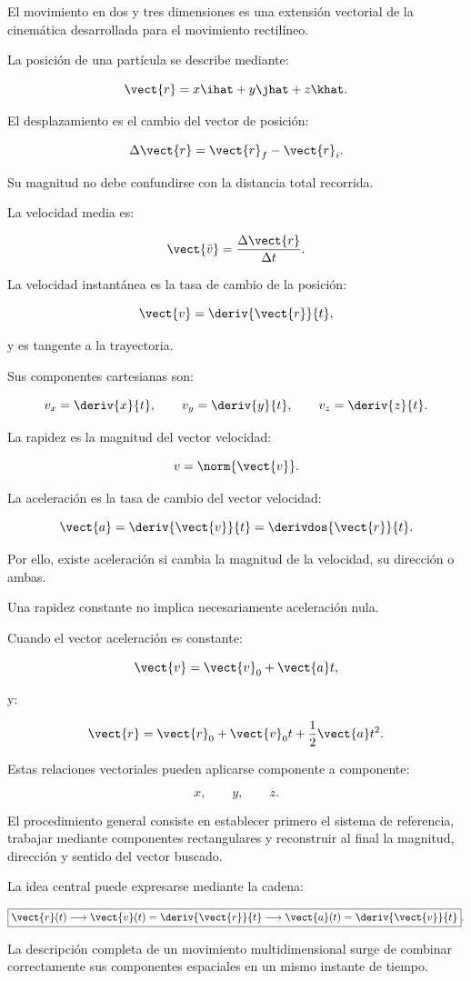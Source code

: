 \begin{resumen}
El movimiento en dos y tres dimensiones es una extensión vectorial de la
cinemática desarrollada para el movimiento rectilíneo.

La posición de una partícula se describe mediante:

\[
\vect{r}
=
x\ihat+y\jhat+z\khat.
\]

El desplazamiento es el cambio del vector de posición:

\[
\Delta\vect{r}
=
\vect{r}_f-\vect{r}_i.
\]

Su magnitud no debe confundirse con la distancia total recorrida.

La velocidad media es:

\[
\vect{\bar{v}}
=
\frac{\Delta\vect{r}}{\Delta t}.
\]

La velocidad instantánea es la tasa de cambio de la posición:

\[
\vect{v}
=
\deriv{\vect{r}}{t},
\]

y es tangente a la trayectoria.

Sus componentes cartesianas son:

\[
v_x=\deriv{x}{t},
\qquad
v_y=\deriv{y}{t},
\qquad
v_z=\deriv{z}{t}.
\]

La rapidez es la magnitud del vector velocidad:

\[
v=\norm{\vect{v}}.
\]

La aceleración es la tasa de cambio del vector velocidad:

\[
\vect{a}
=
\deriv{\vect{v}}{t}
=
\derivdos{\vect{r}}{t}.
\]

Por ello, existe aceleración si cambia la magnitud de la velocidad, su dirección
o ambas.

Una rapidez constante no implica necesariamente aceleración nula.

Cuando el vector aceleración es constante:

\[
\vect{v}
=
\vect{v}_0+\vect{a}t,
\]

y:

\[
\vect{r}
=
\vect{r}_0
+
\vect{v}_0t
+
\frac{1}{2}\vect{a}t^2.
\]

Estas relaciones vectoriales pueden aplicarse componente a componente:

\[
x,\qquad y,\qquad z.
\]

El procedimiento general consiste en establecer primero el sistema de
referencia, trabajar mediante componentes rectangulares y reconstruir al final
la magnitud, dirección y sentido del vector buscado.

La idea central puede expresarse mediante la cadena:

\[
\boxed{
\vect{r}(t)
\longrightarrow
\vect{v}(t)
=
\deriv{\vect{r}}{t}
\longrightarrow
\vect{a}(t)
=
\deriv{\vect{v}}{t}
}.
\]

La descripción completa de un movimiento multidimensional surge de combinar
correctamente sus componentes espaciales en un mismo instante de tiempo.
\end{resumen}
